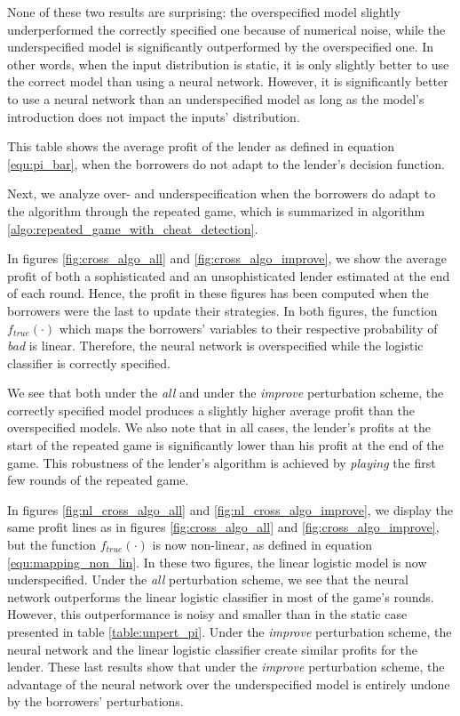 \documentclass[12pt]{article} %
\begin{document}
None of these two results are surprising: the overspecified model slightly underperformed the correctly specified one because of numerical noise, while the underspecified model is significantly outperformed by the overspecified one. In other words, when the input distribution is static, it is only slightly better to use the correct model than using a neural network. However, it is significantly better to use a neural network than an underspecified model as long as the model's introduction does not impact the inputs' distribution. 

\begin{table}[ht!]
   \centering

   \caption{This table shows the average profit of the lender as defined in equation \eqref{equ:pi_bar}, when the borrowers do not adapt to the lender's decision function.
}
\label{table:unpert_pi}
\end{table}

Next, we analyze over- and underspecification when the borrowers do adapt to the algorithm through the repeated game, which is summarized in algorithm \eqref{algo:repeated_game_with_cheat_detection}. 

In figures \ref{fig:cross_algo_all} and \ref{fig:cross_algo_improve}, we show the average profit of both a sophisticated and an unsophisticated lender estimated at the end of each round. Hence, the profit in these figures has been computed when the borrowers were the last to update their strategies. In both figures, the function $f_{true}(\cdot)$ which maps the borrowers' variables to their respective probability of \textit{bad} is linear. Therefore, the neural network is overspecified while the logistic classifier is correctly specified. 

We see that both under the \textit{all} and under the \textit{improve} perturbation scheme, the correctly specified model produces a slightly higher average profit than the overspecified models. We also note that in all cases, the lender's profits at the start of the repeated game is significantly lower than his profit at the end of the game. This robustness of the lender's algorithm is achieved by \textit{playing} the first few rounds of the repeated game. 

In figures \ref{fig:nl_cross_algo_all} and \ref{fig:nl_cross_algo_improve}, we display the same profit lines as in figures \ref{fig:cross_algo_all} and \ref{fig:cross_algo_improve}, but the function $f_{true}(\cdot)$ is now non-linear, as defined in equation \ref{equ:mapping_non_lin}. In these two figures, the linear logistic model is now underspecified. Under the \textit{all} perturbation scheme, we see that the neural network outperforms the linear logistic classifier in most of the game's rounds. However, this outperformance is noisy and smaller than in the static case presented in table \ref{table:unpert_pi}. Under the \textit{improve} perturbation scheme, the neural network and the linear logistic classifier create similar profits for the lender. These last results show that under the \textit{improve} perturbation scheme, the advantage of the neural network over the underspecified model is entirely undone by the borrowers' perturbations. 
\end{document}

